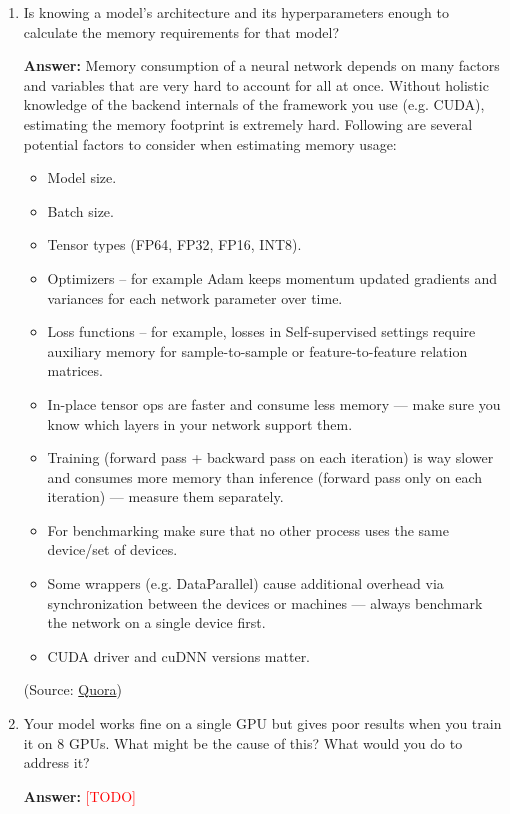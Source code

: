 \documentclass{article}
\newenvironment{QandA}{\begin{enumerate}[label=\arabic*.]}{\end{enumerate}}
\newenvironment{answer}{\par\normalfont \textbf{Answer:}}{}
\newcommand{\todo}{\textcolor{red}{[TODO]}}
\begin{document}
\begin{QandA}
    \item Is knowing a model’s architecture and its hyperparameters enough to calculate the memory requirements for that model?
    \begin{answer}
        Memory consumption of a neural network depends on many factors and variables that are very hard to account for all at once. Without holistic knowledge of the backend internals of the framework you use (e.g. CUDA), estimating the memory footprint is extremely hard.
        Following are several potential factors to consider when estimating memory usage:
        \begin{itemize}
            \item Model size.
            \item Batch size.
            \item Tensor types (FP64, FP32, FP16, INT8).
            \item Optimizers -- for example Adam keeps momentum updated gradients and variances for each network parameter over time.
            \item Loss functions -- for example, losses in Self-supervised settings require auxiliary memory for sample-to-sample or feature-to-feature relation matrices.
            \item In-place tensor ops are faster and consume less memory — make sure you know which layers in your network support them. 
            \item Training (forward pass + backward pass on each iteration) is way slower and consumes more memory than inference (forward pass only on each iteration) — measure them separately.
            \item For benchmarking make sure that no other process uses the same device/set of devices.
            \item Some wrappers (e.g. DataParallel) cause additional overhead via synchronization between the devices or machines — always benchmark the network on a single device first.
            \item CUDA driver and cuDNN versions matter.
        \end{itemize}

        (Source: \href{https://qr.ae/pve5Jd}{Quora})
    \end{answer}

    \item Your model works fine on a single GPU but gives poor results when you train it on 8 GPUs. What might be the cause of this? What would you do to address it?
    \begin{answer}
        \todo
    \end{answer}


\end{QandA}
\end{document}
